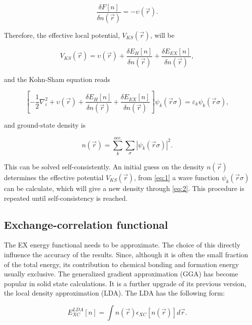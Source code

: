 \begin{equation}
\frac{\delta F[n]}{\delta n(\vec{r})}=-\upsilon(\vec{r}).
\end{equation}

Therefore, the effective local potential, $V_{KS}(\vec{r})$, will be

\begin{equation}
V_{KS}(\vec{r})=\upsilon(\vec{r})+\frac{\delta E_H[n]}{\delta n(\vec{r})}+\frac{\delta E_{EX}[n]}{\delta n(\vec{r})},
\end{equation}

and the Kohn-Sham equation reads

\begin{equation}\label{eq:1}
\left[ -\frac{1}{2}\nabla_i^2+\upsilon(\vec{r})+\frac{\delta E_H[n]}{\delta n(\vec{r})}+\frac{\delta E_{EX}[n]}{\delta n(\vec{r})}\right]\mathit{\psi}_k(\vec{r}\sigma)=\varepsilon_k\mathit{\psi}_k(\vec{r}\sigma),
\end{equation}

and ground-state density is 

\begin{equation}\label{eq:2}
n(\vec{r})=\sum_k^{occ.}\sum_\sigma|\mathit{\psi}_k(\vec{r}\sigma)|^2.
\end{equation}

This can be solved self-consistently. An initial guess on the density $n(\vec{r})$ determines the effective potential $V_{KS}(\vec{r})$, from \autoref{eq:1} a wave function $\mathit{\psi}_k(\vec{r}\sigma)$ can be calculate, which will give a new density through \autoref{eq:2}. This procedure is repeated until self-consistency is reached. 

\subsection{Exchange-correlation functional}

The EX energy functional needs to be approximate. The choice of this directly influence the accuracy of the results. Since, although it is often the small fraction of the total energy, its contribution to chemical bonding and formation energy usually exclusive. The generalized gradient approximation (GGA) has become popular in solid state calculations. It is a further upgrade of its previous version, the local density approximation (LDA). The LDA has the following form:

\begin{equation}
E_{XC}^{LDA}[n]=\int n(\vec{r})\epsilon_{XC}[n(\vec{r})]d\vec{r}.
\end{equation}

